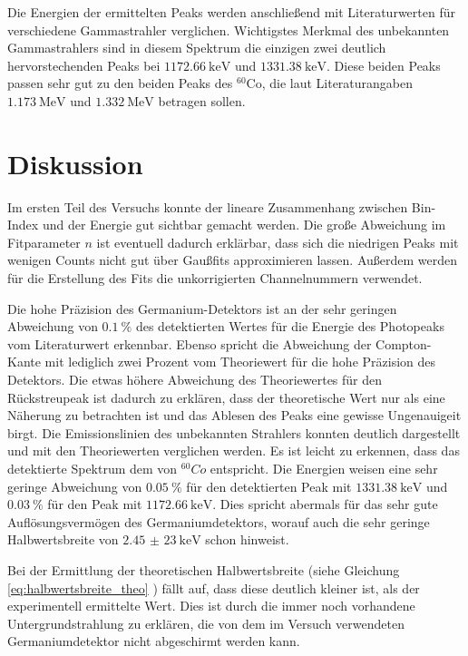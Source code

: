 \noindent Die Energien der ermittelten Peaks werden anschließend mit Literaturwerten für verschiedene Gammastrahler verglichen. Wichtigstes Merkmal des unbekannten Gammastrahlers sind in diesem Spektrum die einzigen zwei deutlich hervorstechenden Peaks bei $\SI{1172,66}{\kilo \electronvolt}$ und $\SI{1331,38}{\kilo \electronvolt}$. Diese beiden Peaks passen sehr gut zu den beiden Peaks des $^{60}$Co, die laut Literaturangaben \cite{Q4} $\SI{1,173}{\mega \electronvolt}$ und $\SI{1,332}{\mega \electronvolt}$ betragen sollen.

\section{Diskussion}
Im ersten Teil des Versuchs konnte der lineare Zusammenhang zwischen Bin-Index
und der Energie gut sichtbar gemacht werden.
Die große Abweichung im Fitparameter $n$ ist eventuell dadurch erklärbar, dass
sich die niedrigen Peaks mit wenigen Counts nicht gut über Gaußfits
approximieren lassen. Außerdem werden für die Erstellung des Fits die
unkorrigierten Channelnummern verwendet.

\noindent Die hohe Präzision des Germanium-Detektors ist an der sehr geringen
Abweichung von $\SI{0,1}{\percent}$ des detektierten Wertes für die Energie des
Photopeaks vom Literaturwert \cite{Q3} erkennbar. Ebenso spricht die Abweichung
der Compton-Kante mit lediglich zwei Prozent vom Theoriewert für die hohe
Präzision des Detektors. Die etwas höhere Abweichung des Theoriewertes für den
Rückstreupeak ist dadurch zu erklären, dass der theoretische Wert nur als eine
Näherung zu betrachten ist und das Ablesen des Peaks eine gewisse Ungenauigeit
birgt.
Die Emissionslinien des unbekannten Strahlers konnten deutlich dargestellt und
mit den Theoriewerten verglichen werden. Es ist leicht zu erkennen, dass das
detektierte Spektrum dem von $^{60}Co$ entspricht. Die Energien weisen eine
sehr geringe Abweichung von $\SI{0,05}{\percent}$ für den detektierten Peak mit
$\SI{1331,38}{\kilo \electronvolt}$ und $\SI{0,03}{\percent}$ für den Peak mit
$\SI{1172,66}{\kilo \electronvolt}$. Dies spricht abermals für das sehr gute
Auflösungsvermögen des Germaniumdetektors, worauf auch die sehr geringe Halbwertsbreite von $\SI{2,45(23)}{\kilo \electronvolt}$ schon hinweist.

\noindent Bei der Ermittlung der theoretischen Halbwertsbreite
(siehe Gleichung \ref{eq:halbwertsbreite_theo} ) fällt auf, dass diese deutlich kleiner ist, als
der experimentell ermittelte Wert. Dies ist durch die immer noch vorhandene
Untergrundstrahlung zu erklären, die von dem im Versuch verwendeten
Germaniumdetektor nicht abgeschirmt werden kann.


\printbibliography
